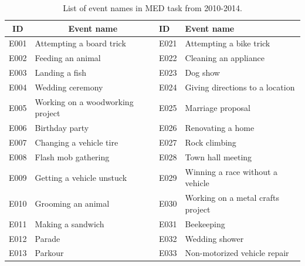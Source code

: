 \begin{table}
	\centering
	\caption{List of event names in MED task from 2010-2014.}	
	\renewcommand{\arraystretch}{1.5}		
	\begin{tabular}{@{}|c|l|l|l|@{}}
		\toprule
		\textbf{ID}                & \multicolumn{1}{c|}{\textbf{Event name}} & \textbf{ID} & \textbf{Event name}               \\ \midrule
		E001                       & Attempting a board trick                 & E021        & Attempting a bike trick           \\ \midrule
		E002                       & Feeding an animal                        & E022        & Cleaning an appliance             \\ \midrule
		E003                       & Landing a fish                           & E023        & Dog show                          \\ \midrule
		E004                       & Wedding ceremony                         & E024        & Giving directions to a location   \\ \midrule
		E005                       & Working on a woodworking project         & E025        & Marriage proposal                 \\ \midrule
		E006                       & Birthday party                           & E026        & Renovating a home                 \\ \midrule
		E007                       & Changing a vehicle tire                  & E027        & Rock climbing                     \\ \midrule
		E008                       & Flash mob gathering                      & E028        & Town hall meeting                 \\ \midrule
		E009                       & Getting a vehicle unstuck                & E029        & Winning a race without a vehicle  \\ \midrule
		E010                       & Grooming an animal                       & E030        & Working on a metal crafts project \\ \midrule
		\multicolumn{1}{|l|}{E011} & Making a sandwich                        & E031        & Beekeeping                        \\ \midrule
		\multicolumn{1}{|l|}{E012} & Parade                                   & E032        & Wedding shower                    \\ \midrule
		\multicolumn{1}{|l|}{E013} & Parkour                                  & E033        & Non-motorized vehicle repair      \\ \midrule

\end{tabular}
\end{table}
